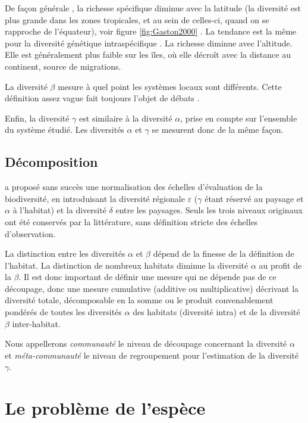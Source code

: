\documentclass[
  11pt,
  french,
  a4paper,
  extrafontsizes,onecolumn,openright
  ]{memoir}
\begin{document}
De façon générale \autocite{Gaston2000}, la richesse spécifique diminue avec la latitude (la diversité est plus grande dans les zones tropicales, et au sein de celles-ci, quand on se rapproche de l'équateur), voir figure \ref{fig:Gaston2000} \autocite[figure 1]{Gaston2000}.
La tendance est la même pour la diversité génétique intraspécifique \autocite{Miraldo2016}.
La richesse diminue avec l'altitude.
Elle est généralement plus faible sur les îles, où elle décroît avec la distance au continent, source de migrations.

La diversité \(\beta\) mesure à quel point les systèmes locaux sont différents. Cette définition assez vague fait toujours l'objet de débats \autocite{Moreno2010}.

Enfin, la diversité \(\gamma\) est similaire à la diversité \(\alpha\), prise en compte sur l'ensemble du système étudié.
Les diversités \(\alpha\) et \(\gamma\) se mesurent donc de la même façon.

\subsection{Décomposition}\label{duxe9composition}

\textcite{Whittaker1977} a proposé sans succès une normalisation des échelles d'évaluation de la biodiversité, en introduisant la diversité régionale \(\varepsilon\) (\(\gamma\) étant réservé au paysage et \(\alpha\) à l'habitat) et la diversité \(\delta\) entre les paysages.
Seuls les trois niveaux originaux ont été conservés par la littérature, sans définition stricte des échelles d'observation.

La distinction entre les diversités \(\alpha\) et \(\beta\) dépend de la finesse de la définition de l'habitat.
La distinction de nombreux habitats diminue la diversité \(\alpha\) au profit de la \(\beta\).
Il est donc important de définir une mesure qui ne dépende pas de ce découpage, donc une mesure cumulative (additive ou multiplicative) décrivant la diversité totale, décomposable en la somme ou le produit convenablement pondérés de toutes les diversités \(\alpha\) des habitats (diversité intra) et de la diversité \(\beta\) inter-habitat.

Nous appellerons \emph{communauté} le niveau de découpage concernant la diversité \(\alpha\) et \emph{méta-communauté} le niveau de regroupement pour l'estimation de la diversité \(\gamma\).

\section{Le problème de l'espèce}\label{le-probluxe8me-de-lespuxe8ce}
\end{document}
